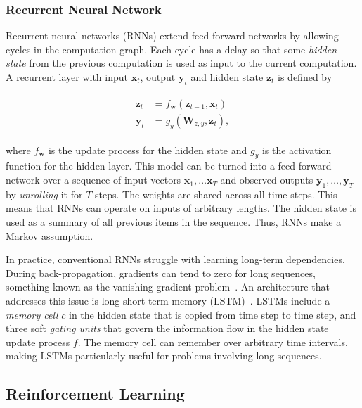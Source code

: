 \subsubsection{Recurrent Neural Network}
\label{sec:rnn}

Recurrent neural networks (RNNs) extend feed-forward networks by allowing cycles in the computation graph.
Each cycle has a delay so that some \textit{hidden state} from the previous computation is used as input to the current computation.
A recurrent layer with input \(\mathbf{x}_t\), output \(\mathbf{y}_t\) and hidden state \(\mathbf{z}_t\) is defined by

\begin{align}
    \begin{split}
        \mathbf{z}_t &= f_\mathbf{w}(\mathbf{z}_{t-1}, \mathbf{x}_t) \\
        \mathbf{y}_t &= g_y(\mathbf{W}_{z,y}, \mathbf{z}_t),
    \end{split}
\end{align}

where \(f_\mathbf{w}\) is the update process for the hidden state and \(g_y\) is the activation function for the hidden layer.
This model can be turned into a feed-forward network over a sequence of input vectors \(\mathbf{x}_1, \dots \mathbf{x}_T\) and observed outputs \(\mathbf{y}_1, \dots, \mathbf{y}_T\) by \textit{unrolling} it for \(T\) steps. 
The weights are shared across all time steps.
This means that RNNs can operate on inputs of arbitrary lengths.
The hidden state is used as a summary of all previous items in the sequence.
Thus, RNNs make a Markov assumption.~\cite{russell_artificial_2021}

In practice, conventional RNNs struggle with learning long-term dependencies.
During back-propagation, gradients can tend to zero for long sequences, something known as the vanishing gradient problem~\cite{goodfellow_deep_2016}.
An architecture that addresses this issue is long short-term memory (LSTM)~\cite{hochreiter_long_1997}.
LSTMs include a \textit{memory cell} \(c\) in the hidden state that is copied from time step to time step, and three soft \textit{gating units} that govern the information flow in the hidden state update process \(f\).
The memory cell can remember over arbitrary time intervals, making LSTMs particularly useful for problems involving long sequences.

\subsection{Reinforcement Learning}
\label{sec:reinforcementlearning}

